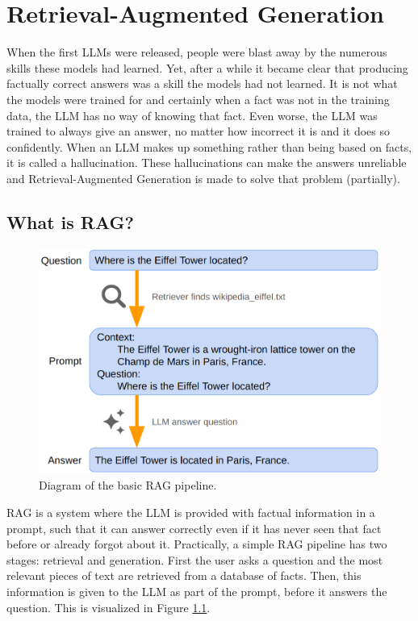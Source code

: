 
\chapter{Retrieval-Augmented Generation}
\label{sec:rag}

When the first LLMs were released, people were blast away by the numerous skills these models had learned. Yet, after a while it became clear that producing factually correct answers was a skill the models had not learned. It is not what the models were trained for and certainly when a fact was not in the training data, the LLM has no way of knowing that fact. Even worse, the LLM was trained to always give an answer, no matter how incorrect it is and it does so confidently. When an LLM makes up something rather than being based on facts, it is called a hallucination. These hallucinations can make the answers unreliable and Retrieval-Augmented Generation is made to solve that problem (partially).

\section{What is RAG?}

\begin{figure}[h]
	\centering
	\captionsetup{justification=centering}
	\includegraphics[width=0.6\linewidth]{fig/RAG.png}
	\caption{Diagram of the basic RAG pipeline.}
	\label{fig:rag}
\end{figure}

RAG is a system where the LLM is provided with factual information in a prompt, such that it can answer correctly even if it has never seen that fact before or already forgot about it. Practically, a simple RAG pipeline has two stages: retrieval and generation. First the user asks a question and the most relevant pieces of text are retrieved from a database of facts. Then, this information is given to the LLM as part of the prompt, before it answers the question. This is visualized in Figure \ref{fig:rag}.

